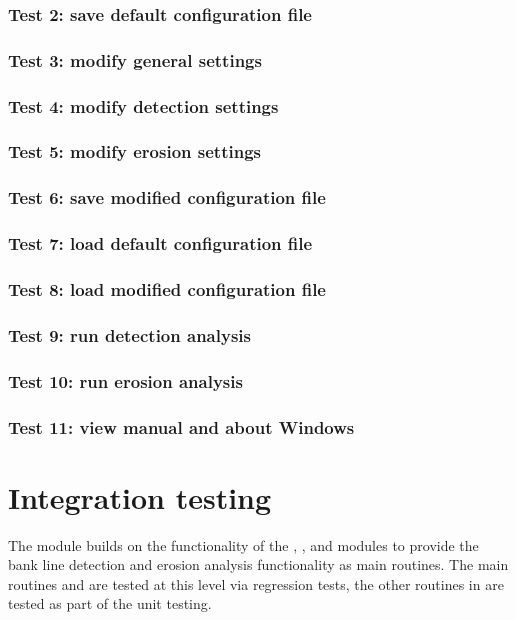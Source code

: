 \subsubsection{Test 2: save default configuration file}
\subsubsection{Test 3: modify general settings}
\subsubsection{Test 4: modify detection settings}
\subsubsection{Test 5: modify erosion settings}
\subsubsection{Test 6: save modified configuration file}
\subsubsection{Test 7: load default configuration file}
\subsubsection{Test 8: load modified configuration file}
\subsubsection{Test 9: run detection analysis}
\subsubsection{Test 10: run erosion analysis}
\subsubsection{Test 11: view manual and about Windows}

\section{Integration testing}

The  module builds on the functionality of the , ,  and  modules to provide the bank line detection and erosion analysis functionality as main routines.
The main routines  and  are tested at this level via regression tests, the other routines in  are tested as part of the unit testing.

